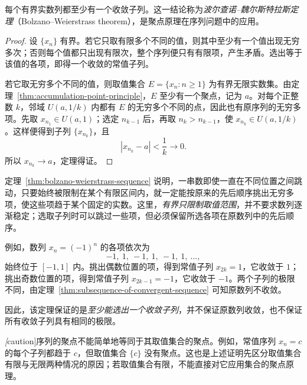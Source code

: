 \documentclass[UTF8,12pt,a4paper,fontset=fandol]{ctexbook}
\begin{document}
\begin{theorem}
\label{thm:bolzano-weierstrass-sequence}
每个有界实数列都至少有一个收敛子列。这一结论称为\emph{波尔查诺--魏尔斯特拉斯定理}（Bolzano--Weierstrass theorem），是聚点原理在序列问题中的应用。
\end{theorem}

\begin{proof}
设 $\{x_n\}$ 有界。若它只取有限多个不同的值，则其中至少有一个值出现无穷多次；否则每个值都只出现有限次，整个序列便只有有限项，产生矛盾。选出等于该值的各项，即得一个收敛的常值子列。

若它取无穷多个不同的值，则取值集合 $E=\{x_n:n\geq1\}$ 为有界无限实数集。由定理~\ref{thm:accumulation-point-principle}，$E$ 至少有一个聚点，记为 $a$。对每个正整数 $k$，邻域 $U(a,1/k)$ 内都有 $E$ 的无穷多个不同的点，因此也有原序列的无穷多项。先取 $x_{n_1}\in U(a,1)$；选定 $n_{k-1}$ 后，再取 $n_k>n_{k-1}$，使 $x_{n_k}\in U(a,1/k)$。这样便得到子列 $\{x_{n_k}\}$，且
\[
    |x_{n_k}-a|<\frac1k\longrightarrow0.
\]
所以 $x_{n_k}\to a$，定理得证。
\end{proof}

\begin{notealert}[title={波尔查诺--魏尔斯特拉斯定理的直观理解}]
定理~\ref{thm:bolzano-weierstrass-sequence} 说明，一串数即使一直在不同位置之间跳动，只要始终被限制在某个有限区间内，就一定能按原来的先后顺序挑出无穷多项，使这些项趋于某个固定的实数。这里，\emph{有界只限制取值范围}，并不要求数列逐渐稳定；选取子列时可以跳过一些项，但必须保留所选各项在原数列中的先后顺序。

例如，数列 $x_n=(-1)^n$ 的各项依次为
\[
    -1,\ 1,\ -1,\ 1,\ -1,\ 1,\ \ldots,
\]
始终位于 $[-1,1]$ 内。挑出偶数位置的项，得到常值子列 $x_{2k}=1$，它收敛于 $1$；挑出奇数位置的项，得到常值子列 $x_{2k-1}=-1$，它收敛于 $-1$。两个子列的极限不同，由定理~\ref{thm:subsequence-of-convergent-sequence} 可知原数列不收敛。

因此，该定理保证的是\emph{至少能选出一个收敛子列}，并不保证原数列收敛，也不保证所有收敛子列具有相同的极限。
\end{notealert}

\begin{remark}
\label{rem:set-and-sequence-cluster-points}
\emph[caution]{序列的聚点不能简单地等同于其取值集合的聚点。}例如，常值序列 $x_n=c$ 的每个子列都趋于 $c$，但取值集合 $\{c\}$ 没有聚点。这也是上述证明先区分取值集合有限与无限两种情况的原因；若取值集合有限，不能直接对它应用集合的聚点原理。
\end{remark}
\end{document}
